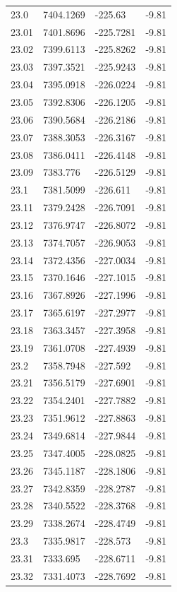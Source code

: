 \begin{table}[H]
\begin{tabular}{llll}
23.0 & 7404.1269 & -225.63 & -9.81 \\
23.01 & 7401.8696 & -225.7281 & -9.81 \\
23.02 & 7399.6113 & -225.8262 & -9.81 \\
23.03 & 7397.3521 & -225.9243 & -9.81 \\
23.04 & 7395.0918 & -226.0224 & -9.81 \\
23.05 & 7392.8306 & -226.1205 & -9.81 \\
23.06 & 7390.5684 & -226.2186 & -9.81 \\
23.07 & 7388.3053 & -226.3167 & -9.81 \\
23.08 & 7386.0411 & -226.4148 & -9.81 \\
23.09 & 7383.776 & -226.5129 & -9.81 \\
23.1 & 7381.5099 & -226.611 & -9.81 \\
23.11 & 7379.2428 & -226.7091 & -9.81 \\
23.12 & 7376.9747 & -226.8072 & -9.81 \\
23.13 & 7374.7057 & -226.9053 & -9.81 \\
23.14 & 7372.4356 & -227.0034 & -9.81 \\
23.15 & 7370.1646 & -227.1015 & -9.81 \\
23.16 & 7367.8926 & -227.1996 & -9.81 \\
23.17 & 7365.6197 & -227.2977 & -9.81 \\
23.18 & 7363.3457 & -227.3958 & -9.81 \\
23.19 & 7361.0708 & -227.4939 & -9.81 \\
23.2 & 7358.7948 & -227.592 & -9.81 \\
23.21 & 7356.5179 & -227.6901 & -9.81 \\
23.22 & 7354.2401 & -227.7882 & -9.81 \\
23.23 & 7351.9612 & -227.8863 & -9.81 \\
23.24 & 7349.6814 & -227.9844 & -9.81 \\
23.25 & 7347.4005 & -228.0825 & -9.81 \\
23.26 & 7345.1187 & -228.1806 & -9.81 \\
23.27 & 7342.8359 & -228.2787 & -9.81 \\
23.28 & 7340.5522 & -228.3768 & -9.81 \\
23.29 & 7338.2674 & -228.4749 & -9.81 \\
23.3 & 7335.9817 & -228.573 & -9.81 \\
23.31 & 7333.695 & -228.6711 & -9.81 \\
23.32 & 7331.4073 & -228.7692 & -9.81 \\

\end{tabular}
\end{table}
